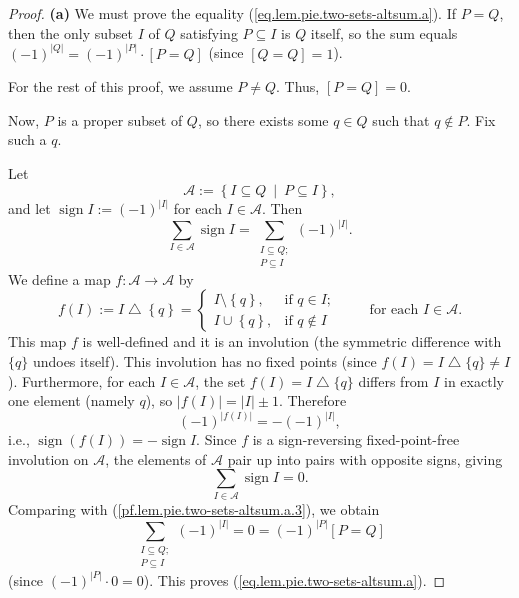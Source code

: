 \begin{proof}
\textbf{(a)} We must prove the equality (\ref{eq.lem.pie.two-sets-altsum.a}). If $P=Q$,
then the only subset $I$ of $Q$ satisfying $P\subseteq I$ is $Q$ itself,
so the sum equals $(-1)^{|Q|} = (-1)^{|P|} \cdot [P = Q]$
(since $[Q = Q] = 1$).

For the rest of this proof, we assume $P\neq Q$. Thus, $\left[  P=Q\right]  =0$.

Now, $P$ is a proper subset of $Q$, so there exists some $q\in Q$
such that $q\notin P$. Fix such a $q$.

Let
\[
\mathcal{A}:=\left\{  I\subseteq Q\ \mid\ P\subseteq I\right\},
\]
and let $\operatorname{sign} I := (-1)^{|I|}$ for each $I\in\mathcal{A}$.
Then
\begin{equation}
\sum_{I\in\mathcal{A}}\operatorname{sign} I=\sum_{\substack{I\subseteq
Q;\\P\subseteq I}}\left(  -1\right)  ^{\left\vert I\right\vert }.
\label{pf.lem.pie.two-sets-altsum.a.3}
\end{equation}
We define a map $f:\mathcal{A}\rightarrow\mathcal{A}$ by
\[
f\left(  I\right)  :=I\bigtriangleup\left\{  q\right\}  =
\begin{cases}
I\setminus\left\{  q\right\}  , & \text{if }q\in I;\\
I\cup\left\{  q\right\}  , & \text{if }q\notin I
\end{cases}
\ \ \ \ \ \ \ \ \ \ \text{for each }I\in\mathcal{A}.
\]
This map $f$ is well-defined
and it is an involution (the symmetric difference with $\{q\}$ undoes itself).
This involution has no fixed points
(since $f(I) = I \bigtriangleup \{q\} \neq I$).
Furthermore, for each $I \in \mathcal{A}$, the set $f(I) = I \bigtriangleup \{q\}$
differs from $I$ in exactly one element (namely $q$), so
$|f(I)| = |I| \pm 1$. Therefore
\[
(-1)^{|f(I)|} = -(-1)^{|I|},
\]
i.e., $\operatorname{sign}(f(I)) = -\operatorname{sign} I$.
Since $f$ is a sign-reversing fixed-point-free involution on $\mathcal{A}$,
the elements of $\mathcal{A}$ pair up into pairs with opposite signs, giving
\[
\sum_{I\in\mathcal{A}}\operatorname{sign} I = 0.
\]
Comparing with (\ref{pf.lem.pie.two-sets-altsum.a.3}), we obtain
\[
\sum_{\substack{I\subseteq Q;\\P\subseteq I}}\left(  -1\right)  ^{\left\vert
I\right\vert }=0=\left(  -1\right)  ^{\left\vert P\right\vert }\left[
P=Q\right]
\]
(since $(-1)^{|P|} \cdot 0 = 0$).
This proves (\ref{eq.lem.pie.two-sets-altsum.a}).
\medskip


\end{proof}
